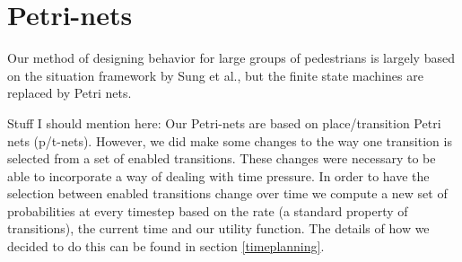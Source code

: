 \documentclass[11pt]{book}
\begin{document}
\section{Petri-nets}
Our method of designing behavior for large groups of pedestrians is largely based on the situation framework by Sung et al., but the finite state machines are replaced by Petri nets.

Stuff I should mention here:
Our Petri-nets are based on place/transition Petri nets (p/t-nets). However, we did make some changes to the way one transition is selected from a set of enabled transitions. These changes were necessary to be able to incorporate a way of dealing with time pressure. In order to have the selection between enabled transitions change over time we compute a new set of probabilities at every timestep based on the rate (a standard property of transitions), the current time and our utility function. The details of how we decided to do this can be found in section \ref{timeplanning}.
\end{document}

